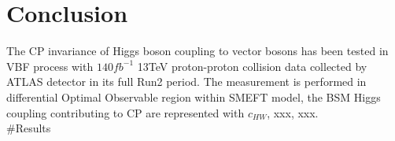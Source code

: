 \section{Conclusion}
\label{sec:conclusion}

The CP invariance of Higgs boson coupling to vector bosons has been tested in VBF \Hyy process with $140 fb^{-1}$ 13TeV proton-proton collision data collected by ATLAS detector in its full Run2 period. The measurement is performed in differential Optimal Observable region within SMEFT model, the BSM Higgs coupling contributing to CP are represented with $c_{HW}$, xxx, xxx. \\

\#Results 

